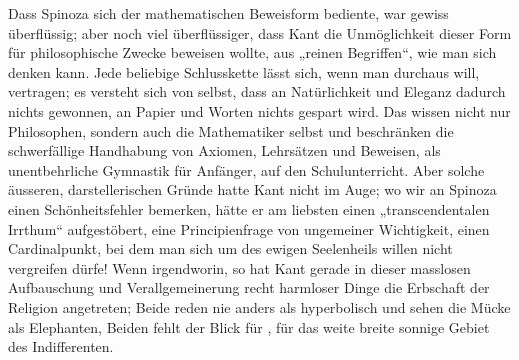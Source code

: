 Dass Spinoza sich der mathematischen Beweisform bediente, war gewiss überflüssig; aber noch viel überflüssiger, dass Kant die Unmöglichkeit dieser Form für philosophische Zwecke beweisen wollte, aus „reinen Begriffen“, wie man sich denken kann. Jede beliebige Schlusskette lässt sich, wenn man durchaus will,  vertragen; es versteht sich von selbst, dass an Natürlichkeit und Eleganz dadurch nichts gewonnen, an Papier und Worten nichts gespart wird. Das wissen nicht nur Philosophen, sondern auch die Mathematiker selbst und beschränken die schwerfällige Handhabung von Axiomen, Lehrsätzen und Beweisen, als unentbehrliche Gymnastik für Anfänger, auf den Schulunterricht. Aber solche äusseren, darstellerischen Gründe hatte Kant nicht im Auge; wo wir an Spinoza einen Schönheitsfehler bemerken, hätte er am liebsten einen „transcendentalen Irrthum“ aufgestöbert, eine Principienfrage von ungemeiner Wichtigkeit, einen Cardinalpunkt, bei dem man sich um des ewigen Seelenheils willen nicht vergreifen dürfe! Wenn irgendworin, so hat Kant gerade in dieser masslosen Aufbauschung und Verallgemeinerung recht harmloser Dinge die Erbschaft der Religion angetreten; Beide reden nie anders als hyperbolisch und sehen die Mücke als Elephanten, Beiden fehlt der Blick für \textit{}, für das weite breite sonnige Gebiet des Indifferenten.
\par

